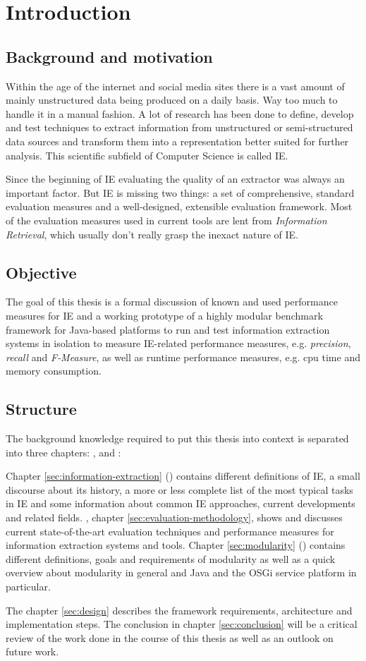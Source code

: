 \section{Introduction}

\subsection{Background and motivation}
Within the age of the internet and social media sites there is a vast amount of mainly unstructured data being produced on a daily basis. Way too much to handle it in a manual fashion. A lot of research has been done to define, develop and test techniques to extract information from unstructured or semi-structured data sources and transform them into a representation better suited for further analysis. This scientific subfield of Computer Science is called \gls{IE}.

Since the beginning of \gls{IE} evaluating the quality of an extractor was always an important factor. But \gls{IE} is missing two things: a set of comprehensive, standard evaluation measures and a well-designed, extensible evaluation framework. Most of the evaluation measures used in current tools are lent from \textit{Information Retrieval}, which usually don't really grasp the inexact nature of \gls{IE}.

\subsection{Objective}
The goal of this thesis is a formal discussion of known and used performance measures for IE and a working prototype of a highly modular benchmark framework for Java-based platforms to run and test information extraction systems in isolation to measure IE-related performance measures, e.g. \textit{precision}, \textit{recall} and \textit{F-Measure}, as well as runtime performance measures, e.g. cpu time and memory consumption.

\subsection{Structure}
The background knowledge required to put this thesis into context is separated into three chapters: ,  and :

Chapter \ref{sec:information-extraction} () contains different definitions of \gls{IE}, a small discourse about its history, a more or less complete list of the most typical tasks in \gls{IE} and some information about common \gls{IE} approaches, current developments and related fields. , chapter \ref{sec:evaluation-methodology}, shows and discusses current state-of-the-art evaluation techniques and performance measures for information extraction systems and tools. Chapter \ref{sec:modularity} () contains different definitions, goals and requirements of modularity as well as a quick overview about modularity in general and Java and the \gls{OSGi} service platform in particular.

The chapter \ref{sec:design}  describes the framework requirements, architecture and implementation steps. The conclusion in chapter \ref{sec:conclusion} will be a critical review of the work done in the course of this thesis as well as an outlook on future work.